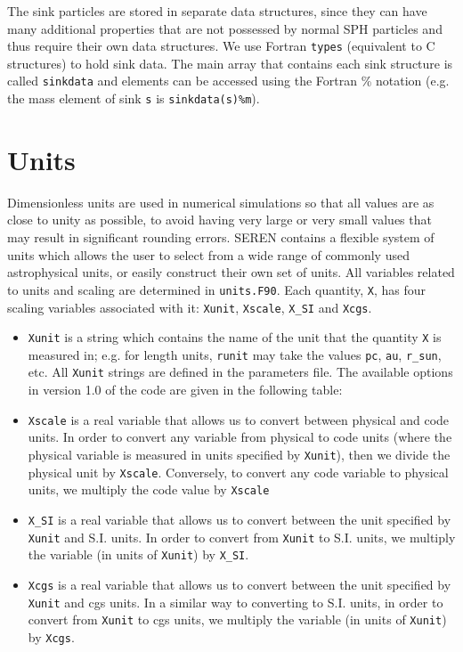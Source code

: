 \documentclass[a4paper]{article}
\newcommand{\var}[1]{\texttt{#1}}
\begin{document}
The sink particles are stored in separate data structures, since they can have many additional properties that are not possessed by normal SPH particles and thus require their own data structures.  We use Fortran \var{types} (equivalent to C structures) to hold sink data.  The main array that contains each sink structure is called \var{sinkdata} and elements can be accessed using the Fortran \% notation (e.g. the mass element of sink \var{s} is \var{sinkdata(s)\%m}).  


\newpage
\section{Units}
Dimensionless units are used in numerical simulations so that all values are as close to unity as possible, to avoid having very large or very small values that may result in significant rounding errors.  SEREN contains a flexible system of units which allows the user to select from a wide range of commonly used astrophysical units, or easily construct their own set of units.  All variables related to units and scaling are determined in \var{units.F90}.  Each quantity, \var{X}, has four scaling variables associated with it: \var{Xunit}, \var{Xscale}, \var{X\_SI} and \var{Xcgs}.


\begin{itemize}
\item \var{Xunit} is a string which contains the name of the unit that the quantity \var{X} is measured in; e.g. for length units, \var{runit} may take the values \var{pc}, \var{au}, \var{r\_sun}, etc.   All \var{Xunit} strings are defined in the parameters file.  The available options in version 1.0 of the code are given in the following table: 

\item \var{Xscale} is a real variable that allows us to convert between physical and code units.  In order to convert any variable from physical to code units (where the physical variable is measured in units specified by \var{Xunit}), then we divide the physical unit by \var{Xscale}.  Conversely, to convert any code variable to physical units, we multiply the code value by \var{Xscale}
\item \var{X\_SI} is a real variable that allows us to convert between the unit specified by \var{Xunit} and S.I. units.  In order to convert from \var{Xunit} to S.I. units, we multiply the variable (in units of \var{Xunit}) by \var{X\_SI}.
\item \var{Xcgs} is a real variable that allows us to convert between the unit specified by \var{Xunit} and cgs units.  In a similar way to converting to S.I. units, in order to convert from \var{Xunit} to cgs units, we multiply the variable (in units of \var{Xunit}) by \var{Xcgs}.
\end{itemize}
\end{document}
